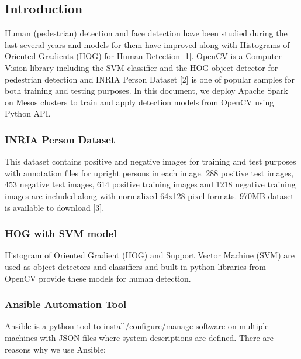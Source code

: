 \subsection{Introduction}\label{introduction}

Human (pedestrian) detection and face detection have been studied during
the last several years and models for them have improved along with
Histograms of Oriented Gradients (HOG) for Human Detection {[}1{]}.
OpenCV is a Computer Vision library including the SVM classifier and the
HOG object detector for pedestrian detection and INRIA Person Dataset
{[}2{]} is one of popular samples for both training and testing
purposes. In this document, we deploy Apache Spark on Mesos clusters to
train and apply detection models from OpenCV using Python API.

\subsubsection{INRIA Person Dataset}\label{inria-person-dataset}

This dataset contains positive and negative images for training and test
purposes with annotation files for upright persons in each image. 288
positive test images, 453 negative test images, 614 positive training
images and 1218 negative training images are included along with
normalized 64x128 pixel formats. 970MB dataset is available to download
{[}3{]}.

\subsubsection{HOG with SVM model}\label{hog-with-svm-model}

Histogram of Oriented Gradient (HOG) and Support Vector Machine (SVM)
are used as object detectors and classifiers and built-in python
libraries from OpenCV provide these models for human detection.

\subsubsection{Ansible Automation Tool}\label{ansible-automation-tool}

Ansible is a python tool to install/configure/manage software on
multiple machines with JSON files where system descriptions are defined.
There are reasons why we use Ansible:

